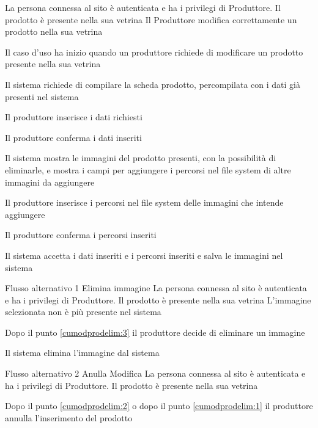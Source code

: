 {}
{La persona connessa al sito è autenticata e ha i privilegi di Produttore. Il prodotto è presente nella sua vetrina}%
{Il Produttore modifica correttamente un prodotto nella sua vetrina}
{\begin{enumCU}
		\item Il caso d'uso ha inizio quando un produttore richiede di modificare un prodotto presente nella sua vetrina
		\item Il sistema richiede di compilare la scheda prodotto, percompilata con i dati già presenti nel sistema
		\item Il produttore inserisce i dati richiesti \label{cumodprodelim:1}
		\item Il produttore conferma i dati inseriti
		\item Il sistema mostra le immagini del prodotto presenti, con la possibilità di eliminarle, e mostra i campi per aggiungere i percorsi nel file system di altre immagini da aggiungere \label{cumodprodelim:3}
		\item Il produttore inserisce i percorsi nel file system delle immagini che intende aggiungere
		\item Il produttore conferma i percorsi inseriti \label{cumodprodelim:2}
		\item Il sistema accetta i dati inseriti e i percorsi inseriti e salva le immagini nel sistema
	\end{enumCU}} %
%
{Flusso alternativo 1}%
{Elimina immagine}%
{La persona connessa al sito è autenticata e ha i privilegi di Produttore. Il prodotto è presente nella sua vetrina}
{L'immagine selezionata non è più presente nel sistema}%
{\begin{enumCU}
		\item Dopo il punto \ref{cumodprodelim:3} il produttore decide di eliminare un immagine
		\item Il sistema elimina l'immagine dal sistema
	\end{enumCU}}%
%
{Flusso alternativo 2}%
{Anulla Modifica}%
{La persona connessa al sito è autenticata e ha i privilegi di Produttore. Il prodotto è presente nella sua vetrina}%
{\postNulle}%
{\begin{enumCU}
		\item Dopo il punto \ref{cumodprodelim:2} o dopo il punto \ref{cumodprodelim:1} il produttore annulla l'inserimento del prodotto
	\end{enumCU}}%

